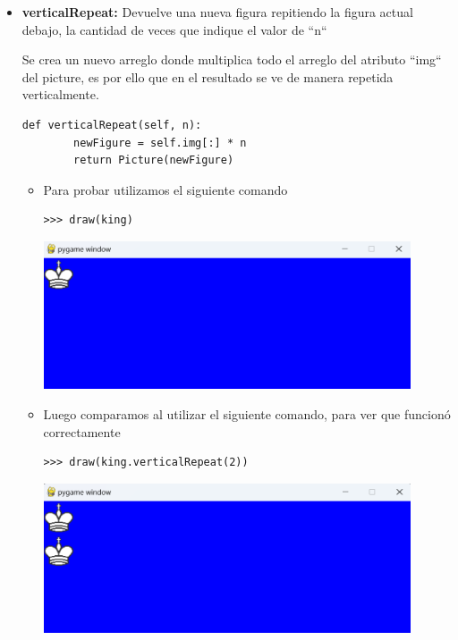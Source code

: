 \documentclass{article}
\begin{document}
\begin{itemize}
  \pagebreak

  \item \textbf{verticalRepeat:} Devuelve una nueva figura repitiendo la figura actual debajo, la cantidad de veces que indique el valor de ``n``
  
  \vspace{\baselineskip}

  Se crea un nuevo arreglo donde multiplica todo el arreglo del atributo ``img`` del picture, es por ello que en el resultado se ve de manera repetida verticalmente.

    \begin{lstlisting}[style=python]
    def verticalRepeat(self, n):
        newFigure = self.img[:] * n
        return Picture(newFigure)
    \end{lstlisting}

    \vspace{\baselineskip}

    \begin{itemize}
      \item Para probar utilizamos el siguiente comando

      \begin{lstlisting}[style=shell]
      >>> draw(king)
      \end{lstlisting}
      \begin{minipage}{\linewidth}
        \centering
        \includegraphics[width=0.9\textwidth]{imagenes/p_verticalr1.png}
      \end{minipage}

      \vspace{2\baselineskip}

      \item Luego comparamos al utilizar el siguiente comando, para ver que funcionó correctamente
      \begin{lstlisting}[style=shell]
      >>> draw(king.verticalRepeat(2))
      \end{lstlisting}
      \begin{minipage}{\linewidth}
        \centering
        \includegraphics[width=0.9\textwidth]{imagenes/p_verticalr2.png}
      \end{minipage}
    \end{itemize}


\end{itemize}
\end{document}
